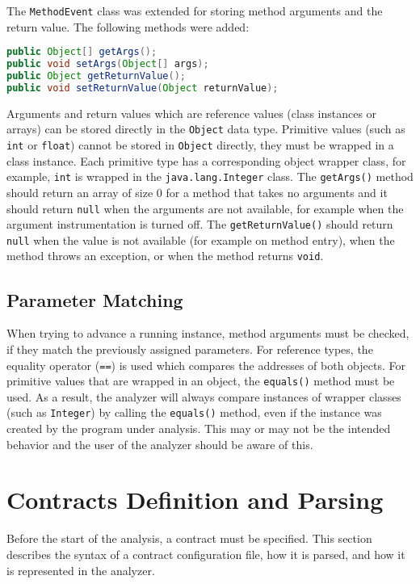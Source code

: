 The \texttt{MethodEvent} class was extended for storing method arguments and the
return value. The following methods were added:

\begin{lstlisting}[language=java]
public Object[] getArgs();
public void setArgs(Object[] args);
public Object getReturnValue();
public void setReturnValue(Object returnValue);
\end{lstlisting}

Arguments and return values which are reference values (class instances or
arrays) can be stored directly in the \texttt{Object} data type. Primitive
values (such as \texttt{int} or \texttt{float}) cannot be stored in
\texttt{Object} directly, they must be wrapped in a class instance. Each
primitive type has a corresponding object wrapper class, for example,
\texttt{int} is wrapped in the \texttt{java.lang.Integer} class. The
\texttt{getArgs()} method should return an array of size 0 for a method that
takes no arguments and it should return \texttt{null} when the arguments are not
available, for example when the argument instrumentation is turned off. The
\texttt{getReturnValue()} should return \texttt{null} when the value is not
available (for example on method entry), when the method throws an exception, or
when the method returns \texttt{void}.

\subsection{Parameter Matching}
When trying to advance a running instance, method arguments must be checked, if
they match the previously assigned parameters. For reference types, the equality
operator (\texttt{==}) is used which compares the addresses of both objects. For
primitive values that are wrapped in an object, the \texttt{equals()} method
must be used. As a result, the analyzer will always compare instances of wrapper
classes (such as \texttt{Integer}) by calling the \texttt{equals()} method, even
if the instance was created by the program under analysis. This may or may not
be the intended behavior and the user of the analyzer should be aware of this.

\section{Contracts Definition and Parsing}
\label{contracts}

Before the start of the analysis, a contract must be specified. This section
describes the syntax of a contract configuration file, how it is parsed, and how
it is represented in the analyzer.

